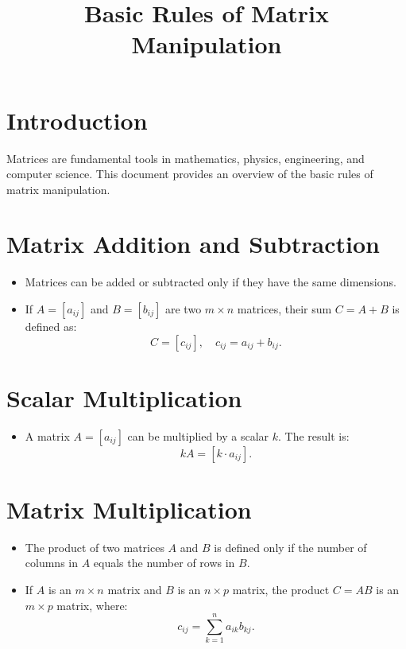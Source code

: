 \documentclass[12pt]{article}
\title{Basic Rules of Matrix Manipulation}
\author{}
\date{}
\begin{document}
\maketitle

\section*{Introduction}
Matrices are fundamental tools in mathematics, physics, engineering, and computer science. This document provides an overview of the basic rules of matrix manipulation.

\section*{Matrix Addition and Subtraction}
\begin{itemize}
    \item Matrices can be added or subtracted only if they have the same dimensions.
    \item If \( A = [a_{ij}] \) and \( B = [b_{ij}] \) are two \( m \times n \) matrices, their sum \( C = A + B \) is defined as:
    \[
    C = [c_{ij}], \quad c_{ij} = a_{ij} + b_{ij}.
    \]
\end{itemize}

\section*{Scalar Multiplication}
\begin{itemize}
    \item A matrix \( A = [a_{ij}] \) can be multiplied by a scalar \( k \). The result is:
    \[
    kA = [k \cdot a_{ij}].
    \]
\end{itemize}

\section*{Matrix Multiplication}
\begin{itemize}
    \item The product of two matrices \( A \) and \( B \) is defined only if the number of columns in \( A \) equals the number of rows in \( B \).
    \item If \( A \) is an \( m \times n \) matrix and \( B \) is an \( n \times p \) matrix, the product \( C = AB \) is an \( m \times p \) matrix, where:
    \[
    c_{ij} = \sum_{k=1}^n a_{ik} b_{kj}.
    \]
\end{itemize}
\end{document}
